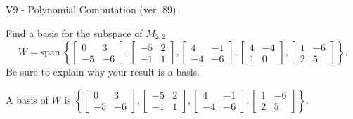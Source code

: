 \begin{exercise}
  \begin{exerciseTitle}V9 - Polynomial Computation (ver. 89)\end{exerciseTitle}
  \begin{exerciseStatement}
    Find a basis for the subspace of \(M_{2,2}\) 
\[W=\mathrm{span}\ \left\{\left[\begin{array}{cc}
0 & 3 \\
-5 & -6
\end{array}\right] , \left[\begin{array}{cc}
-5 & 2 \\
-1 & 1
\end{array}\right] , \left[\begin{array}{cc}
4 & -1 \\
-4 & -6
\end{array}\right] , \left[\begin{array}{cc}
4 & -4 \\
1 & 0
\end{array}\right] , \left[\begin{array}{cc}
1 & -6 \\
2 & 5
\end{array}\right]\right\}.\]
 Be sure to explain why your result is a basis.


  \end{exerciseStatement}
  \begin{exerciseAnswer}
   A basis of \(W\) is  \(\left\{\left[\begin{array}{cc}
0 & 3 \\
-5 & -6
\end{array}\right] , \left[\begin{array}{cc}
-5 & 2 \\
-1 & 1
\end{array}\right] , \left[\begin{array}{cc}
4 & -1 \\
-4 & -6
\end{array}\right] , \left[\begin{array}{cc}
1 & -6 \\
2 & 5
\end{array}\right]\right\}\).
  


  \end{exerciseAnswer}
\end{exercise}